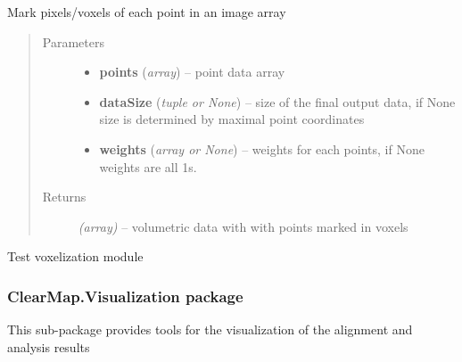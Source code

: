 \documentclass[letterpaper,10pt,english]{sphinxmanual}
\begin{document}

\begin{fulllineitems}
\label{api/ClearMap.Analysis:ClearMap.Analysis.Voxelization.voxelizePixel}
Mark pixels/voxels of each point in an image array
\begin{quote}\begin{description}
\item[{Parameters}] \leavevmode\begin{itemize}
\item {} 
\textbf{points} (\emph{array}) --
point data array

\item {} 
\textbf{dataSize} (\emph{tuple or None}) --
size of the final output data, if None size is determined by maximal point coordinates

\item {} 
\textbf{weights} (\emph{array or None}) --
weights for each points, if None weights are all 1s.

\end{itemize}

\item[{Returns}] \leavevmode
\emph{(array)} --
volumetric data with with points marked in voxels

\end{description}\end{quote}

\end{fulllineitems}


\begin{fulllineitems}
\label{api/ClearMap.Analysis:ClearMap.Analysis.Voxelization.test}
Test voxelization module

\end{fulllineitems}



\subsubsection{ClearMap.Visualization package}
\label{api/ClearMap.Visualization:module-ClearMap.Visualization}\label{api/ClearMap.Visualization::doc}\label{api/ClearMap.Visualization:clearmap-visualization-package}
This sub-package provides tools for the visualization of the alignment and
analysis results
\end{document}
